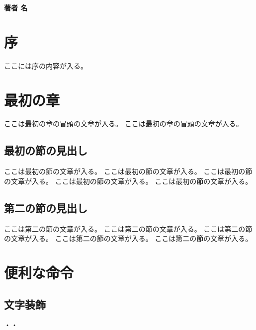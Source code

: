 \documentclass[ %
    uplatex, %
    tate, %
    hanging_punctuation, %
    paper=b6, %
    reference_mark=interlinear, %
    book %
]{jlreq}
\begin{document}
\begin{titlepage}
  \vspace*{10mm}
  \vfill

  \begin{flushright}
    {\gtfamily\bfseries\huge 著者 名}
  \end{flushright}
\end{titlepage}

{}
\chapter*{序}

ここには序の内容が入る。

\tableofcontents %


\chapter{最初の章}

ここは最初の章の冒頭の文章が入る。
ここは最初の章の冒頭の文章が入る。


\section{最初の節の見出し}

ここは最初の節の文章が入る。
ここは最初の節の文章が入る。
ここは最初の節の文章が入る。
ここは最初の節の文章が入る。
ここは最初の節の文章が入る。


\section{第二の節の見出し}

ここは第二の節の文章が入る。
ここは第二の節の文章が入る。
ここは第二の節の文章が入る。
ここは第二の節の文章が入る。
ここは第二の節の文章が入る。


\chapter{便利な命令}

\section{文字装飾}

  ・・
\end{document}
